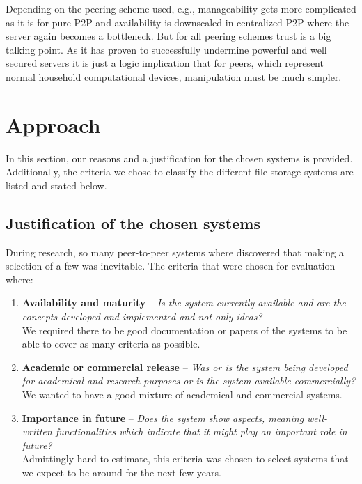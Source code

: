 Depending on the peering scheme used, e.g., manageability gets more complicated as it is for pure P2P and availability is downscaled in centralized P2P where the server again becomes a bottleneck. But for all peering schemes trust is a big talking point. As it has proven to successfully undermine powerful and well secured servers it is just a logic implication that for peers, which represent normal household computational devices, manipulation must be much simpler.

\section{Approach} %
\label{sec:approach}
In this section, our reasons and a justification for the chosen systems is provided. Additionally, the criteria we chose to classify the different file storage systems are listed and stated below.

\subsection{Justification of the chosen systems}
During research, so many peer-to-peer systems where discovered that making a selection of a few was inevitable. The criteria that were chosen for evaluation where:
\begin{enumerate}
\item \textbf{Availability and maturity} -- \textit{Is the system currently available and are the concepts developed and implemented and not only ideas?}\\
We required there to be good documentation or papers of the systems to be able to cover as many criteria as possible.

\item \textbf{Academic or commercial release} -- \textit{Was or is the system being developed for academical and research purposes or is the system available commercially?}\\
We wanted to have a good mixture of academical and commercial systems.

\item \textbf{Importance in future} -- \textit{Does the system show aspects, meaning well-written functionalities which indicate that it might play an important role in future?}\\
Admittingly hard to estimate, this criteria was chosen to select systems that we expect to be around for the next few years.
\end{enumerate}

